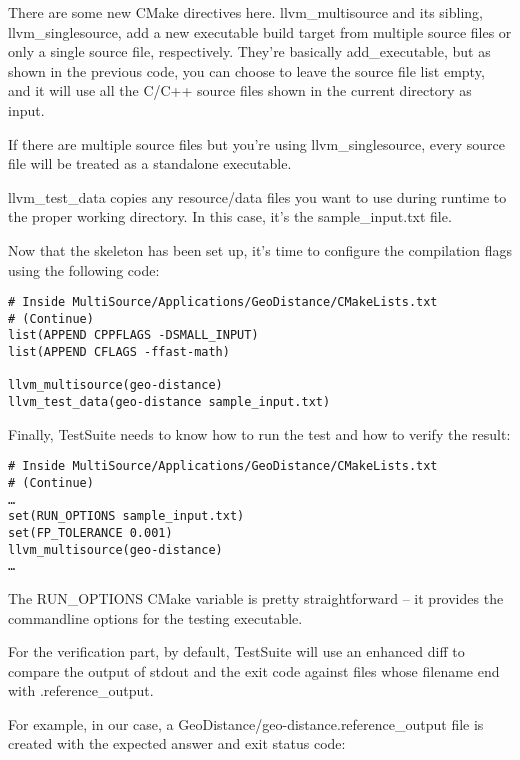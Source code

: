There are some new CMake directives here. llvm\_multisource and its sibling, llvm\_singlesource, add a new executable build target from multiple source files or only a single source file, respectively. They're basically add\_executable, but as shown in the previous code, you can choose to leave the source file list empty, and it will use all the C/C++ source files shown in the current directory as input.

\begin{tcolorbox}[colback=blue!5!white,colframe=blue!75!black, fonttitle=\bfseries,title=Note]
\hspace*{0.7cm}If there are multiple source files but you're using llvm\_singlesource, every source file will be treated as a standalone executable.
\end{tcolorbox}

llvm\_test\_data copies any resource/data files you want to use during runtime to the proper working directory. In this case, it's the sample\_input.txt file.

Now that the skeleton has been set up, it's time to configure the compilation flags using the following code:

\begin{lstlisting}[style=styleCMake]
# Inside MultiSource/Applications/GeoDistance/CMakeLists.txt
# (Continue)
list(APPEND CPPFLAGS -DSMALL_INPUT)
list(APPEND CFLAGS -ffast-math)

llvm_multisource(geo-distance)
llvm_test_data(geo-distance sample_input.txt)
\end{lstlisting}

Finally, TestSuite needs to know how to run the test and how to verify the result:

\begin{lstlisting}[style=styleCMake]
# Inside MultiSource/Applications/GeoDistance/CMakeLists.txt
# (Continue)
…
set(RUN_OPTIONS sample_input.txt)
set(FP_TOLERANCE 0.001)
llvm_multisource(geo-distance)
…
\end{lstlisting}

The RUN\_OPTIONS CMake variable is pretty straightforward – it provides the commandline options for the testing executable.

For the verification part, by default, TestSuite will use an enhanced diff to compare the output of stdout and the exit code against files whose filename end with .reference\_output.

For example, in our case, a GeoDistance/geo-distance.reference\_output file is created with the expected answer and exit status code:

